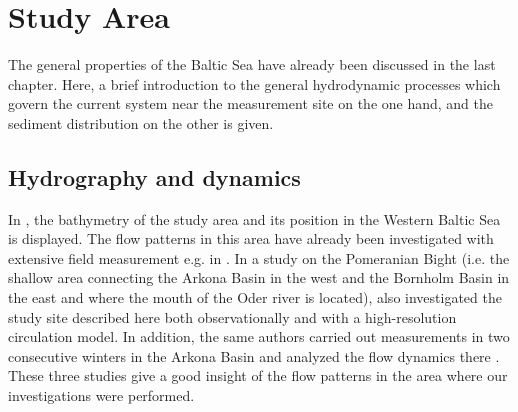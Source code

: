 \section{Study Area}

The general properties of the Baltic Sea have already been discussed in the 
last chapter. Here, a brief introduction to the general hydrodynamic 
processes which govern the current system near the measurement site on the one 
hand, and the sediment distribution on the other is given.

\subsection{Hydrography and dynamics}

In , the bathymetry of the study area and its position in the 
Western Baltic Sea is displayed. The flow patterns in this area have already 
been investigated with extensive field measurement e.g. in \cite{lass1993}. In 
a study on the Pomeranian Bight (i.e. the shallow area connecting the Arkona 
Basin in the west and the Bornholm Basin in the east and where the mouth of the 
Oder river is located), \cite{lass2001} also investigated the study site 
described here both observationally and with a high-resolution circulation 
model. In addition, the same authors carried out measurements in two consecutive 
winters in the Arkona Basin and analyzed the flow dynamics there 
\citep[][]{lass2003}. These three studies give a good insight 
of the flow patterns in the area where our investigations were performed.
 
